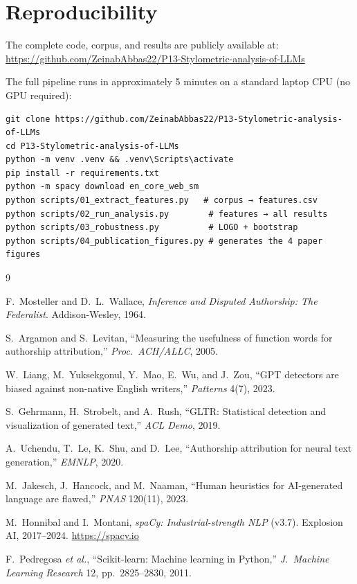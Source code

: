 \documentclass[11pt,a4paper]{article}
\begin{document}
\section*{Reproducibility}

The complete code, corpus, and results are publicly available at:\\[4pt]
\url{https://github.com/ZeinabAbbas22/P13-Stylometric-analysis-of-LLMs}

\noindent The full pipeline runs in approximately 5 minutes on a
standard laptop CPU (no GPU required):
\begin{small}
\begin{verbatim}
git clone https://github.com/ZeinabAbbas22/P13-Stylometric-analysis-of-LLMs
cd P13-Stylometric-analysis-of-LLMs
python -m venv .venv && .venv\Scripts\activate
pip install -r requirements.txt
python -m spacy download en_core_web_sm
python scripts/01_extract_features.py   # corpus → features.csv
python scripts/02_run_analysis.py        # features → all results
python scripts/03_robustness.py          # LOGO + bootstrap
python scripts/04_publication_figures.py # generates the 4 paper figures
\end{verbatim}
\end{small}

\begin{thebibliography}{9}
\small

F.~Mosteller and D.~L.~Wallace,
\textit{Inference and Disputed Authorship: The Federalist}.
Addison-Wesley, 1964.

S.~Argamon and S.~Levitan,
``Measuring the usefulness of function words for authorship attribution,''
\textit{Proc.\ ACH/ALLC}, 2005.

W.~Liang, M.~Yuksekgonul, Y.~Mao, E.~Wu, and J.~Zou,
``GPT detectors are biased against non-native English writers,''
\textit{Patterns} 4(7), 2023.

S.~Gehrmann, H.~Strobelt, and A.~Rush,
``GLTR: Statistical detection and visualization of generated text,''
\textit{ACL Demo}, 2019.

A.~Uchendu, T.~Le, K.~Shu, and D.~Lee,
``Authorship attribution for neural text generation,''
\textit{EMNLP}, 2020.

M.~Jakesch, J.~Hancock, and M.~Naaman,
``Human heuristics for AI-generated language are flawed,''
\textit{PNAS} 120(11), 2023.

M.~Honnibal and I.~Montani,
\textit{spaCy: Industrial-strength NLP} (v3.7).
Explosion AI, 2017--2024. \url{https://spacy.io}

F.~Pedregosa \textit{et al.},
``Scikit-learn: Machine learning in Python,''
\textit{J.\ Machine Learning Research} 12, pp.~2825--2830, 2011.

\end{thebibliography}
\end{document}
